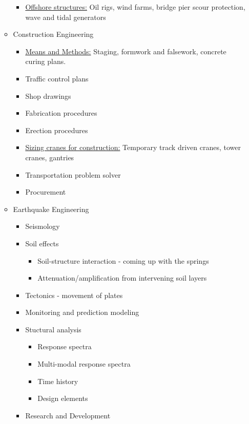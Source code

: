 \documentclass{article}
\begin{document}
\begin{itemize}
\begin{itemize}
\begin{itemize}
            \item \underline{Offshore structures:} Oil rigs, wind farms, bridge pier scour protection, wave and tidal generators
        \end{itemize}
        \item Construction Engineering
        \begin{itemize}
            \item \underline{Means and Methods:} Staging, formwork and falsework, concrete curing plans.
            \item Traffic control plans
            \item Shop drawings
            \item Fabrication procedures
            \item Erection procedures
            \item \underline{Sizing cranes for construction:} Temporary track driven cranes, tower cranes, gantries
            \item Transportation problem solver
            \item Procurement
        \end{itemize}
        \item Earthquake Engineering
        \begin{itemize}
            \item Seismology
            \item Soil effects
            \begin{itemize}
                \item Soil-structure interaction - coming up with the springs
                \item Attenuation/amplification from intervening soil layers
            \end{itemize}
            \item Tectonics - movement of plates
            \item Monitoring and prediction modeling
            \item Stuctural analysis
            \begin{itemize}
                \item Response spectra
                \item Multi-modal response spectra
                \item Time history
                \item Design elements
            \end{itemize}
            \item Research and Development

\end{itemize}
\end{itemize}
\end{itemize}
\end{document}
